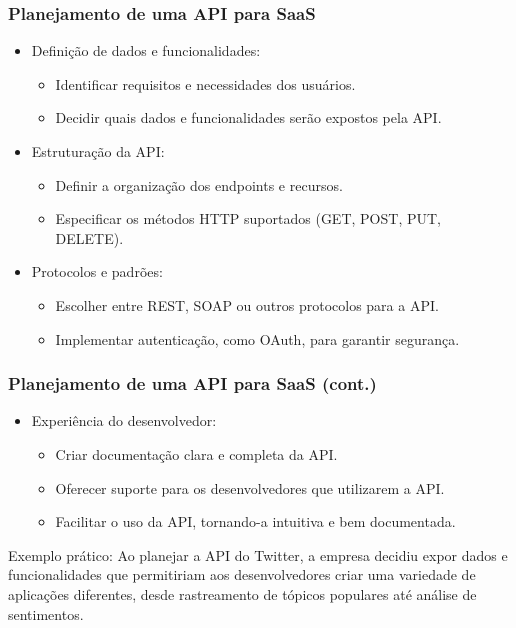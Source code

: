 \documentclass{beamer}
\begin{document}
\begin{frame}
	\frametitle{Planejamento de uma API para SaaS}

	\begin{itemize}
		\item Definição de dados e funcionalidades:
		      \begin{itemize}
			      \item Identificar requisitos e necessidades dos usuários.
			      \item Decidir quais dados e funcionalidades serão expostos pela API.
		      \end{itemize}

		\item Estruturação da API:
		      \begin{itemize}
			      \item Definir a organização dos endpoints e recursos.
			      \item Especificar os métodos HTTP suportados (GET, POST, PUT, DELETE).
		      \end{itemize}

		\item Protocolos e padrões:
		      \begin{itemize}
			      \item Escolher entre REST, SOAP ou outros protocolos para a API.
			      \item Implementar autenticação, como OAuth, para garantir segurança.
		      \end{itemize}
	\end{itemize}

\end{frame}
\begin{frame}
	\frametitle{Planejamento de uma API para SaaS (cont.)}

	\begin{itemize}
		\item Experiência do desenvolvedor:
		      \begin{itemize}
			      \item Criar documentação clara e completa da API.
			      \item Oferecer suporte para os desenvolvedores que utilizarem a API.
			      \item Facilitar o uso da API, tornando-a intuitiva e bem documentada.
		      \end{itemize}
	\end{itemize}

	Exemplo prático: Ao planejar a API do Twitter, a empresa decidiu expor dados e funcionalidades que permitiriam aos desenvolvedores criar uma variedade de aplicações diferentes, desde rastreamento de tópicos populares até análise de sentimentos.

\end{frame}
\end{document}
